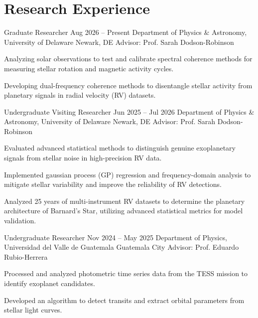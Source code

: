 \section{Research Experience}

\resumeExpEntry
    {Graduate Researcher}
    {Aug 2026 – Present}
    {Department of Physics \& Astronomy, University of Delaware}
    {Newark, DE}
    {Advisor: Prof. Sarah Dodson-Robinson}
    {
        \item Analyzing solar observations to test and calibrate spectral coherence methods for measuring stellar rotation and magnetic activity cycles.
        \item Developing dual-frequency coherence methods to disentangle stellar activity from planetary signals in radial velocity (RV) datasets.
    }

\resumeExpEntry
    {Undergraduate Visiting Researcher}
    {Jun 2025 – Jul 2026}
    {Department of Physics \& Astronomy, University of Delaware}
    {Newark, DE}
    {Advisor: Prof. Sarah Dodson-Robinson}
    {
        \item Evaluated advanced statistical methods to distinguish genuine exoplanetary signals from stellar noise in high-precision RV data.
        \item Implemented gaussian process (GP) regression and frequency-domain analysis to mitigate stellar variability and improve the reliability of RV detections.
        \item Analyzed 25 years of multi-instrument RV datasets to determine the planetary architecture of Barnard's Star, utilizing advanced statistical metrics for model validation.
    }

\resumeExpEntry
    {Undergraduate Researcher}
    {Nov 2024 – May 2025}
    {Department of Physics, Universidad del Valle de Guatemala}
    {Guatemala City}
    {Advisor: Prof. Eduardo Rubio-Herrera}
    {
        \item Processed and analyzed photometric time series data from the TESS mission to identify exoplanet candidates.
        \item Developed an algorithm to detect transits and extract orbital parameters from stellar light curves.
    }
